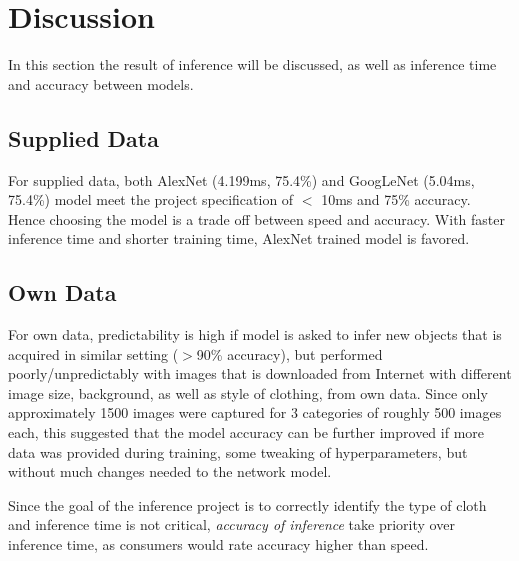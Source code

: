 \documentclass[10pt,journal,compsoc]{IEEEtran}
\begin{document}

\newpage
\section{Discussion}
In this section the result of inference will be discussed, as well as inference time and accuracy between models.

\subsection{Supplied Data}
For supplied data, both AlexNet (4.199ms, 75.4\%) and GoogLeNet (5.04ms, 75.4\%) model meet the project specification of $<$ 10ms and 75\% accuracy.  Hence choosing the model is a trade off between speed and accuracy.  With faster inference time and shorter training time, AlexNet trained model is favored.

\subsection{Own Data}
For own data, predictability is high if model is asked to infer new objects that is acquired in similar setting ($>$90\% accuracy), but performed poorly/unpredictably with images that is downloaded from Internet with different image size, background, as well as style of clothing, from own data.  Since only approximately 1500 images were captured for 3 categories of roughly 500 images each, this suggested that the model accuracy can be further improved if more data was provided during training, some tweaking of hyperparameters, but without much changes needed to the network model.\linebreak

Since the goal of the inference project is to correctly identify the type of cloth and inference time is not critical, \textit{accuracy of inference} take priority over inference time, as consumers would rate accuracy higher than speed.
\end{document}
